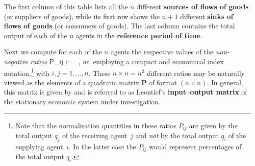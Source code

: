 %
The first column of this table lists all the $n$ different {\bf 
sources of flows of goods} (or suppliers of goods), while its 
first row shows the $n+1$ different {\bf sinks of flows of goods} 
(or consumers of goods). The last column contains the total output 
of each of the $n$ agents in the {\bf reference period of time}.

\medskip
\noindent
Next we compute for each of the $n$ agents the respective values 
of the \emph{non-negative ratios}
%
\be
P_{ij} :=  \ ,
\ee
%
or, employing a compact and economical index 
notation,\footnote{Note that the normalisation quantities in these 
ratios $P_{ij}$ are given by the total output $q_{j}$ of the 
receiving agent~$j$ and \emph{not} by the total output $q_{i}$ of 
the supplying agent~$i$. In the latter case the $P_{ij}$ would 
represent percentages of the total output $q_{i}$.}
%
\be
{}
\ee
%
with $i,j = 1, \ldots, n$. These $n \times n = n^{2}$ different 
ratios may be naturally viewed as the elements of a quadratic 
matrix $\mathbf{P}$ of format $(n \times n)$. In general, this 
matrix is given by
%
\be
{}
\ee
%
and is referred to as Leontief's {\bf input--output matrix} of the 
stationary economic system under investigation.

